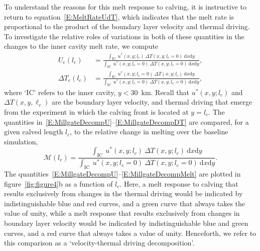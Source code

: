 \documentclass[draft]{agujournal2019}
\begin{document}
To understand the reasons for this melt response to calving, it is instructive to return to equation~\eqref{E:MeltRateUdT}, which indicates that the melt rate is proportional to the product of the boundary layer velocity and thermal driving. To investigate the relative roles of variations in both of these quantities in the changes to the inner cavity melt rate, we compute~\cite{Millgate2013JGROceans}
\begin{align}
  U_{e}(l_c) &=  \frac{\int_{\text{IC}}~u^*(x,y; l_c)~\Delta T(x,y;l_c = 0)~\mathrm{d}x\mathrm{d}y}{\int_{\text{IC}}~ u^*(x,y; l_c = 0)~\Delta T(x,y;l_c = 0)~\mathrm{d}x\mathrm{d}y}, \label{E:MillgateDecompU}\\ \Delta T_{e}(l_c) &=  \frac{\int_{\text{IC}}~u^*(x,y; l_c=0)~\Delta T(x,y;l_c)~\mathrm{d}x\mathrm{d}y}{\int_{\text{IC}}~ u^*(x,y; l_c = 0)~\Delta T(x,y;l_c = 0)~\mathrm{d}x\mathrm{d}y}, \label{E:MillgateDecompDT}
\end{align}
where `IC' refers to the inner cavity, $y < 30$~km. Recall that $u^*(x,y;l_c)$ and $\Delta T(x,y,\ell_c)$ are the boundary layer velocity, and thermal driving that emerge from the experiment in which the calving front is located at $y = l_c$. The quantities in~\eqref{E:MillgateDecompU}--\eqref{E:MillgateDecompDT} are compared, for a given calved length $l_c$, to the relative change in melting over the baseline simulation,
 \begin{equation}\label{E:MillgateDecompMelt}
   \mathcal{M}(l_c) =  \frac{\int_{\text{IC}}~u^*(x,y; l_c)~\Delta T(x,y;l_c)~\mathrm{d}x\mathrm{d}y}{\int_{\text{IC}}~ u^*(x,y; l_c = 0)~\Delta T(x,y;l_c = 0)~\mathrm{d}x\mathrm{d}y}.
 \end{equation}
The quantities~\eqref{E:MillgateDecompU}--\eqref{E:MillgateDecompMelt} are plotted in figure~\ref{fig:figure4}b as a function of $l_c$.  Here, a melt response to calving that results exclusively from changes in the thermal driving would be indicated by indistinguishable blue and red curves, and a green curve that always takes the value of unity, while a melt response that results exclusively from changes in boundary layer velocity would be indicated by indistinguishable blue and green curves, and a red curve that always takes a value of unity. Henceforth, we refer to this comparison as a `velocity-thermal driving decomposition'. %
\end{document}

